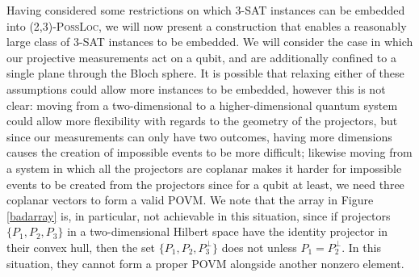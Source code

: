 \documentclass[reprint]{revtex4-1}
\theoremstyle{definition}
\begin{document}
Having considered some restrictions on which \textsc{3-SAT} instances can be embedded into \textsc{(2,3)-PossLoc}, we will now present a construction that enables a reasonably large class of \textsc{3-SAT} instances to be embedded. We will consider the case in which our projective measurements act on a qubit, and are additionally confined to a single plane through the Bloch sphere. It is possible that relaxing either of these assumptions could allow more instances to be embedded, however this is not clear: moving from a two-dimensional to a higher-dimensional quantum system could allow more flexibility with regards to the geometry of the projectors, but since our measurements can only have two outcomes, having more dimensions causes the creation of impossible events to be more difficult; likewise moving from a system in which all the projectors are coplanar makes it harder for impossible events to be created from the projectors since for a qubit at least, we need three coplanar vectors to form a valid POVM. 
We note that the array in Figure \ref{badarray} is, in particular, not achievable in this situation, since if projectors $\{P_1,P_2,P_3\}$ in a two-dimensional Hilbert space have the identity projector in their convex hull, then the set $\{P_1,P_2, P_3^\perp\}$ does not unless $P_1=P_2^\perp$. In this situation, they cannot form a proper POVM alongside another nonzero element.
\end{document}
